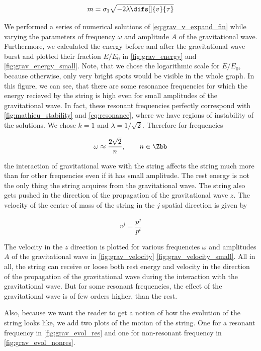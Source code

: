 \begin{equation}
    m = \sigma_1 \sqrt{-2 \lambda \difs[]{v}{\tau}}
\end{equation}

\noindent
We performed a series of numerical solutions of \cref{eq:grav_v_expand_fin} while varying the parameters of frequency $\omega$ and amplitude $A$ of the gravitational wave. Furthermore, we calculated the energy before and after the gravitational wave burst and plotted their fraction $E/E_0$ in \cref{fig:grav_energy} and \cref{fig:grav_energy_small}. Note, that we chose the logarithmic scale for $E/E_0$, because otherwise, only very bright spots would be visible in the whole graph. In this figure, we can see, that there are some resonance frequencies for which the energy recieved by the string is high even for small amplitudes of the gravitational wave. In fact, these resonant frequencies perfectly correspond with \cref{fig:mathieu_stability} and \cref{eq:resonance}, where we have regions of instability of the solutions. We chose $k = 1$ and $\lambda = 1/\sqrt{2}$. Therefore for frequencies 

\begin{equation}
	\omega \approx \frac{2 \sqrt{2}}{n}, \qquad n \in \Zbb
\end{equation}

\noindent
the interaction of gravitational wave with the string affects the string much more than for other frequencies even if it has small amplitude. The rest energy is not the only thing the string acquires from the gravitational wave. The string also gets pushed in the direction of the propagation of the gravitational wave $z$. The velocity of the centre of mass of the string in the $j$ spatial direction is given by

\begin{equation}
	v^j = \frac{p^j}{p^t}
\end{equation}

\noindent
The velocity in the $z$ direction is plotted for various frequencies $\omega$ and amplitudes $A$ of the gravitational wave in \cref{fig:grav_velocity} \cref{fig:grav_velocity_small}. All in all, the string can receive or loose both rest energy and velocity in the direction of the propagation of the gravitational wave during the interaction with the gravitational wave. But for some resonant frequencies, the effect of the gravitational wave is of few orders higher, than the rest.

Also, because we want the reader to get a notion of how the evolution of the string looks like, we add two plots of the motion of the string. One for a resonant frequency in \cref{fig:grav_evol_res} and one for non-resonant frequency in \cref{fig:grav_evol_nonres}.

